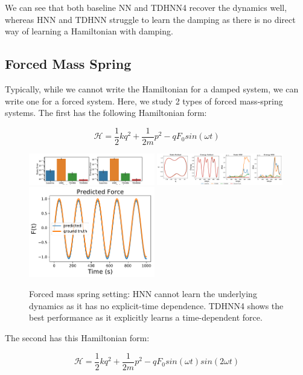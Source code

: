 \documentclass[twoside]{article}
\begin{document}
We can see that both baseline NN and TDHNN4 recover the dynamics well, whereas HNN and TDHNN struggle to learn the damping as there is no direct way of learning a Hamiltonian with damping.

\subsection{Forced Mass Spring}

Typically, while we cannot write the Hamiltonian for a damped system, we can write one for a forced system. Here, we study 2 types of forced mass-spring systems. The first has the following Hamiltonian form:

\begin{equation}
\mathcal{H} = \frac{1}{2}kq^2 + \frac{1}{2m}p^2 - qF_0sin(\omega t) 
\end{equation}

\begin{figure}[h!]
\centering
\includegraphics[width=0.49\textwidth]{figures/mass_spring_forced_1_errors.pdf}
\includegraphics[width=0.49\textwidth]{figures/mass_spring_forced_1_pred.pdf}
\includegraphics[width=0.49\textwidth]{figures/TDHNN4_mass_spring_force_1.pdf}
\caption{Forced mass spring setting: HNN cannot learn the underlying dynamics as it has no explicit-time dependence. TDHNN4 shows the best performance as it explicitly learns a time-dependent force.}
\end{figure}

The second has this Hamiltonian form:

\begin{equation}
\mathcal{H} = \frac{1}{2}kq^2 + \frac{1}{2m}p^2 - qF_0sin(\omega t)sin(2\omega t)
\end{equation}
\end{document}
